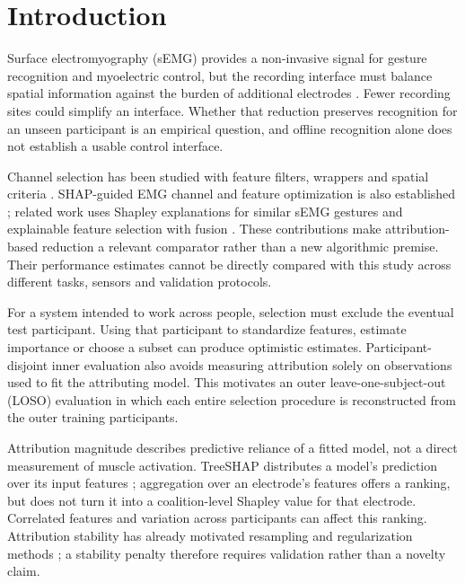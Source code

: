 \section{Introduction}
Surface electromyography (sEMG) provides a non-invasive signal for gesture recognition and myoelectric control, but the recording interface must balance spatial information against the burden of additional electrodes \citep{scheme2011electromyogram,farina2014extraction,vujaklija2016new}. Fewer recording sites could simplify an interface. Whether that reduction preserves recognition for an unseen participant is an empirical question, and offline recognition alone does not establish a usable control interface.

Channel selection has been studied with feature filters, wrappers and spatial criteria \citep{phinyomark2012feature,stango2015spatial,qu2021reduce}. SHAP-guided EMG channel and feature optimization is also established \citep{rani2025shap}; related work uses Shapley explanations for similar sEMG gestures \citep{wang2024shap} and explainable feature selection with fusion \citep{gehlot2024fusion}. These contributions make attribution-based reduction a relevant comparator rather than a new algorithmic premise. Their performance estimates cannot be directly compared with this study across different tasks, sensors and validation protocols.

For a system intended to work across people, selection must exclude the eventual test participant. Using that participant to standardize features, estimate importance or choose a subset can produce optimistic estimates. Participant-disjoint inner evaluation also avoids measuring attribution solely on observations used to fit the attributing model. This motivates an outer leave-one-subject-out (LOSO) evaluation in which each entire selection procedure is reconstructed from the outer training participants.

Attribution magnitude describes predictive reliance of a fitted model, not a direct measurement of muscle activation. TreeSHAP distributes a model's prediction over its input features \citep{lundberg2017unified,lundberg2020local}; aggregation over an electrode's features offers a ranking, but does not turn it into a coalition-level Shapley value for that electrode. Correlated features and variation across participants can affect this ranking. Attribution stability has already motivated resampling and regularization methods \citep{visani2022statistical,xiang2026roshap}; a stability penalty therefore requires validation rather than a novelty claim.

